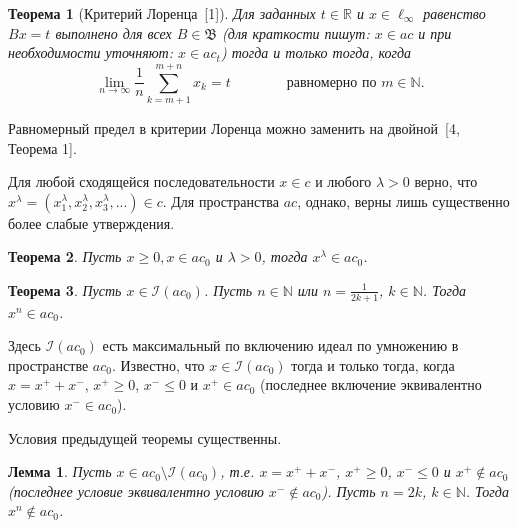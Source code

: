 \documentclass[14pt, a4paper]{extbook}
\newtheorem{theorem}{Теорема}
\newtheorem{lemma}{Лемма}
\begin{document}
\begin{theorem}[{Критерий Лоренца~[1]}]
	Для заданных $t\in\mathbb R$ и $x\in\ell_\infty$ равенство $Bx=t$ выполнено для всех $B\in\mathfrak{B}$
	(для краткости пишут: $x\in ac$ и при необходимости уточняют: $x\in ac_t$)
	тогда и только тогда, когда
	\begin{equation*}
		\label{eq:crit_Lorentz}
		\lim_{n\to\infty} \frac{1}{n} \sum_{k=m+1}^{m+n} x_k = t
		\qquad\qquad\mbox{равномерно по $m\in\mathbb N$.}
	\end{equation*}
\end{theorem}

Равномерный предел в критерии Лоренца можно заменить на двойной~[4, Теорема 1].

Для любой сходящейся последовательности $x\in c$ и любого $\lambda > 0$ верно, что
$x^\lambda = (x_1^\lambda,x_2^\lambda,x_3^\lambda,...) \in c$.
Для пространства $ac$, однако, верны лишь существенно более слабые утверждения.


	\begin{theorem}
		\label{thm:Zvol_pow_pos}
		Пусть $x \geqslant 0, x \in a c_0$ и $\lambda>0$, тогда $x^\lambda \in a c_0$.
	\end{theorem}

	\begin{theorem}
		\label{thm:Zvol_pow_composed}
		Пусть $x\in \mathcal{I}(ac_0)$.
		Пусть $n\in\mathbb{N}$ или $n = \frac1{2k+1}$, $k\in\mathbb{N}$.
		Тогда $x^n \in ac_0$.
	\end{theorem}

	Здесь $\mathcal{I}(ac_0)$ есть максимальный по включению идеал по умножению в пространстве $ac_0$.
	Известно, что $x\in \mathcal{I}(ac_0)$ тогда и только тогда, когда $x = x^+ +x^-$, $x^+\geq 0$, $x^- \leq 0$ и $x^+ \in ac_0$
	(последнее включение эквивалентно условию $x^- \in ac_0$).

	Условия предыдущей теоремы существенны.

	\begin{lemma}
		\label{thm:ac0_pow_even}
		Пусть $x\in ac_0 \setminus \mathcal{I}(ac_0)$, т.е. $x = x^+ +x^-$, $x^+\geq 0$, $x^- \leq 0$ и $x^+ \notin ac_0$
		(последнее условие эквивалентно условию $x^- \notin ac_0$).
		Пусть $n = 2k$, $k\in\mathbb{N}$.
		Тогда $x^n \notin ac_0$.
	\end{lemma}
\end{document}

